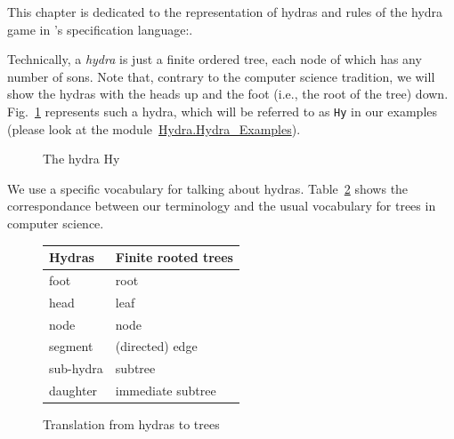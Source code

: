 \documentclass[a4paper]{book}
\begin{document}
This chapter is dedicated to the representation of hydras and rules of the hydra game in \coq's specification language:\gallina. 

Technically, a \emph{hydra} is just a finite ordered tree, each node of which 
has any number of sons. Note that, contrary to the computer science tradition, we will show the hydras 
with the heads up and the foot (i.e., the root of the tree) down.
Fig.~\ref{fig:Hy} represents such  a hydra, which will be referred to as \texttt{Hy} in our examples (please look at the 
module~\href{../src/html/hydras.Hydra.Hydra_Examples.html}{Hydra.Hydra\_Examples}). 

\begin{figure}[h]
\centering
{}
\caption{The hydra Hy \label{fig:Hy}}
\end{figure}



We use a specific vocabulary for talking about hydras. Table~\ref{tab:hyd2tree} shows the correspondance between our terminology and the usual vocabulary for trees in computer science.


\begin{figure}[h]
  \centering
  \begin{tabular}{ll}
Hydras & Finite rooted trees\\
\hline
foot & root\\
head & leaf\\
node & node\\
segment  & (directed) edge \\
sub-hydra & subtree\\
daughter & immediate subtree\\
\end{tabular}
  \caption{Translation from hydras to trees}
  \label{tab:hyd2tree}
\end{figure}
\end{document}
